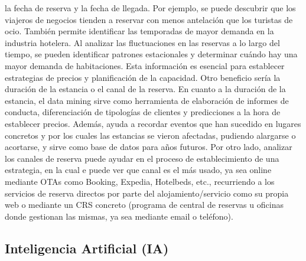 \documentclass[
  letterpaper,
  DIV=11,
  numbers=noendperiod]{scrreprt}
\begin{document}
la fecha de reserva y la fecha de llegada. Por ejemplo, se puede
descubrir que los viajeros de negocios tienden a reservar con menos
antelación que los turistas de ocio. También permite identificar las
temporadas de mayor demanda en la industria hotelera. Al analizar las
fluctuaciones en las reservas a lo largo del tiempo, se pueden
identificar patrones estacionales y determinar cuándo hay una mayor
demanda de habitaciones. Esta información es esencial para establecer
estrategias de precios y planificación de la capacidad. Otro beneficio
sería la duración de la estancia o el canal de la reserva. En cuanto a
la duración de la estancia, el data mining sirve como herramienta de
elaboración de informes de conducta, diferenciación de tipologías de
clientes y predicciones a la hora de establecer precios. Además, ayuda a
recordar eventos que han sucedido en lugares concretos y por los cuales
las estancias se vieron afectadas, pudiendo alargarse o acortarse, y
sirve como base de datos para años futuros. Por otro lado, analizar los
canales de reserva puede ayudar en el proceso de establecimiento de una
estrategia, en la cual e puede ver que canal es el más usado, ya sea
online mediante OTAs como Booking, Expedia, Hotelbeds, etc., recurriendo
a los servicios de reserva directos por parte del alojamiento/servicio
como su propia web o mediante un CRS concreto (programa de central de
reservas u oficinas donde gestionan las mismas, ya sea mediante email o
teléfono).

\hypertarget{inteligencia-artificial-ia}{%
\subsection{Inteligencia Artificial
(IA)}\label{inteligencia-artificial-ia}}
\end{document}
